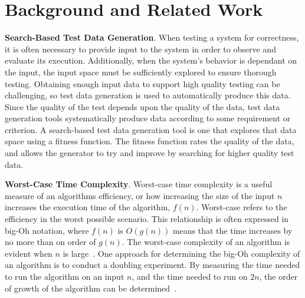 
\section{Background and Related Work}



{\bf Search-Based Test Data Generation}. When testing a system for correctness, it is often necessary to provide input to
the system in order to observe and evaluate its execution. Additionally, when the system's behavior is dependant on the
input, the input space must be sufficiently explored to ensure thorough testing.  Obtaining enough input data to support
high quality testing can be challenging, so test data generation is used to automatically produce this data. Since the
quality of the test depends upon the quality of the data, test data generation tools systematically produce data
according to some requirement or criterion. A search-based test data generation tool is one that explores that data
space using a fitness function.  The fitness function rates the quality of the data, and allows the generator to try and
improve by searching for higher quality test data.




{\bf Worst-Case Time Complexity}. Worst-case time complexity is a useful measure of an algorithms efficiency, or how
increasing the size of the input $n$ increases the execution time of the algorithm, $f(n)$.  Worst-case refers to the
efficiency in the worst possible scenario.  This relationship is often expressed in big-Oh notation, where $f(n)$ is
$O(g(n))$ means that the time increases by no more than on order of $g(n)$. The worst-case complexity of an algorithm is
evident when $n$ is large~\cite{Goodrich2014}. One approach for determining the big-Oh complexity of an algorithm is to
conduct a doubling experiment. By measuring the time needed to run the algorithm on an input $n$, and the time needed to
run on $2n$, the order of growth of the algorithm can be determined~\cite{McGeoch2012,Sedgewick1998}.

